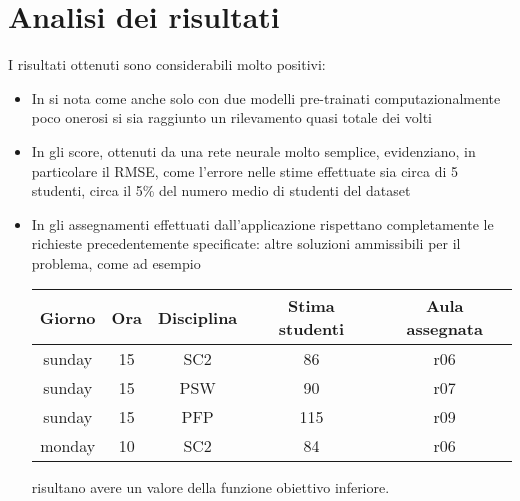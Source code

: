 \newpage

\section{Analisi dei risultati}

I risultati ottenuti sono considerabili molto positivi:

\begin{itemize}
    \item In \textbf{} si nota come anche solo con due modelli pre-trainati
        computazionalmente poco onerosi si sia raggiunto un rilevamento quasi totale dei volti
    \item In \textbf{} gli score, ottenuti da una rete neurale molto semplice,
        evidenziano, in particolare il RMSE, come l'errore nelle stime effettuate sia circa 
        di 5 studenti, circa il 5\% del numero medio di studenti del dataset
    \item In \textbf{} gli assegnamenti effettuati dall'applicazione rispettano
        completamente le richieste precedentemente specificate: altre soluzioni ammissibili per il problema,
        come ad esempio 

        \begin{table}[h]
            \begin{small}
                \begin{center}
                    \begin{tabular}[c]{c|c|c|c|c}
                        Giorno & Ora & Disciplina & Stima studenti & Aula assegnata \\
                        \hline
                        sunday & 15 & SC2 & 86 & r06 \\
                        sunday & 15 & PSW & 90 & r07 \\
                        sunday & 15 & PFP & 115 & r09 \\
                        monday & 10 & SC2 & 84 & r06
                    \end{tabular}
                \end{center}
            \end{small}
        \end{table}

        risultano avere un valore della funzione obiettivo inferiore.

    \end{itemize}
